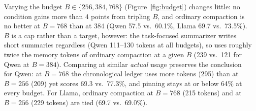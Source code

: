 Varying the budget $B\in\{256,384,768\}$ (Figure~\ref{fig:budget}) changes little: no condition gains more than 4 points from tripling $B$, and ordinary compaction is no better at $B{=}768$ than at 384 (Qwen 57.5 vs.\ 60.1\%, Llama 69.7 vs.\ 73.5\%). $B$ is a cap rather than a target, however: the task-focused summarizer writes short summaries regardless (Qwen 111--130 tokens at all budgets), so \ours uses roughly twice the memory tokens of ordinary compaction at a given $B$ (239 vs.\ 121 for Qwen at $B{=}384$). Comparing at similar \emph{actual} usage preserves the conclusion for Qwen: at $B{=}768$ the chronological ledger uses more tokens (295) than \ours at $B{=}256$ (209) yet scores 69.3 vs.\ 77.3\%, and pinning stays at or below 64\% at every budget. For Llama, ordinary compaction at $B{=}768$ (215 tokens) and \ours at $B{=}256$ (229 tokens) are tied (69.7 vs.\ 69.0\%).
